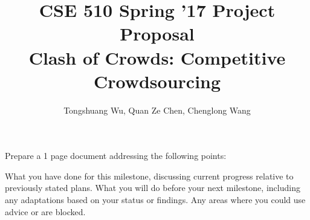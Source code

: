 \documentclass{article}
\date{}
\title{{\large{CSE 510 Spring '17 Project Proposal}}
\\ \textbf{Clash of Crowds: Competitive Crowdsourcing}}
\author{Tongshuang Wu, Quan Ze Chen, Chenglong Wang}
\date{}
\begin{document}
\maketitle

Prepare a 1 page document addressing the following points:

What you have done for this milestone, discussing current progress relative to previously stated plans.
What you will do before your next milestone, including any adaptations based on your status or findings.
Any areas where you could use advice or are blocked.
\end{document}
